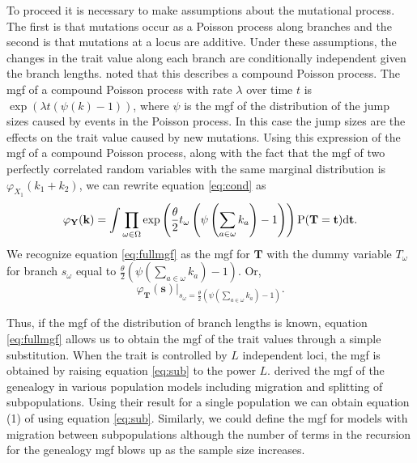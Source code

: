 To proceed it is necessary to make assumptions about the mutational process. The
first is that mutations occur as a Poisson process along branches and the second
is that mutations at a locus are additive. Under these assumptions, the changes
in the trait value along each branch are conditionally independent given the
branch lengths. \citet{Khaitovich2005} noted that this describes a compound
Poisson process. The mgf of a compound Poisson process with rate $\lambda$ over
time $t$ is $\exp(\lambda t (\psi(k)-1))$, where $\psi$ is the mgf of the
distribution of the jump sizes caused by events in the Poisson process. In this
case the jump sizes are the effects on the trait value caused by new mutations.
Using this expression of the mgf of a compound Poisson process, along with the
fact that the mgf of two perfectly correlated random variables with the same
marginal distribution is $\varphi_{X_1}(k_1+k_2)$, we can rewrite
equation \eqref{eq:cond} as
\begin{equation}
  \label{eq:fullmgf}
  \varphi_{\mathbf{Y}}(\mathbf{k}) = 
  \int \prod_{\omega \in \Omega} \exp\left( \frac{\theta}{2} t_{\omega} \left( \psi\left(\sum_{a \in \omega}k_{a}\right) -1 \right)\right)
  \mathrm{P}(\mathbf{T}=\mathbf{t})\mbox{d}\mathbf{t}.
\end{equation}
We recognize equation \eqref{eq:fullmgf} as the mgf for $\mathbf{T}$ with the
dummy variable $T_{\omega}$ for branch $s_\omega$ equal to
$\frac{\theta}{2} \left( \psi(\sum_{a \in \omega}k_{a}) -1 \right)$. Or,
\begin{equation}
  \label{eq:sub}
  \varphi_{\mathbf{T}}(\mathbf{s})\Bigr|_{s_{\omega}=\frac{\theta}{2} \left( \psi\left(\sum_{a \in \omega}k_{a}\right) -1 \right)}.
\end{equation}

Thus, if the mgf of the distribution of branch lengths is known, equation
\eqref{eq:fullmgf} allows us to obtain the mgf of the trait values through a
simple substitution. When the trait is controlled by $L$ independent loci, the
mgf is obtained by raising equation \eqref{eq:sub} to the power $L$.
\citet{Lohse2011} derived the mgf of the genealogy in various population models
including migration and splitting of subpopulations. Using their result for a
single population we can obtain equation (1) of \citet{Schraiber2015} using
equation \eqref{eq:sub}. Similarly, we could define the mgf for models with
migration between subpopulations although the number of terms in the recursion
for the genealogy mgf blows up as the sample size increases.

